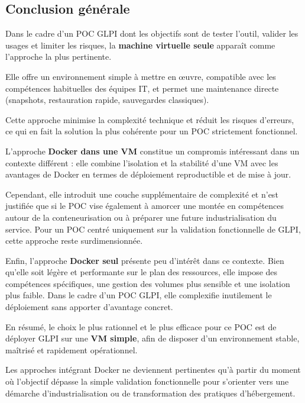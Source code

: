 \subsection*{Conclusion générale}

\noindent Dans le cadre d’un POC GLPI dont les objectifs sont de tester l’outil, valider les usages et limiter les risques, la \textbf{machine virtuelle seule} apparaît comme l’approche la plus pertinente.

\noindent Elle offre un environnement simple à mettre en œuvre, compatible avec les compétences habituelles des équipes IT, et permet une maintenance directe (snapshots, restauration rapide, sauvegardes classiques).

\noindent Cette approche minimise la complexité technique et réduit les risques d’erreurs, ce qui en fait la solution la plus cohérente pour un POC strictement fonctionnel.

\newpage

\noindent L’approche \textbf{Docker dans une VM} constitue un compromis intéressant dans un contexte différent : elle combine l’isolation et la stabilité d’une VM avec les avantages de Docker en termes de déploiement reproductible et de mise à jour.

\noindent Cependant, elle introduit une couche supplémentaire de complexité et n’est justifiée que si le POC vise également à amorcer une montée en compétences autour de la conteneurisation ou à préparer une future industrialisation du service. Pour un POC centré uniquement sur la validation fonctionnelle de GLPI, cette approche reste surdimensionnée.

\noindent Enfin, l’approche \textbf{Docker seul} présente peu d’intérêt dans ce contexte. Bien qu’elle soit légère et performante sur le plan des ressources, elle impose des compétences spécifiques, une gestion des volumes plus sensible et une isolation plus faible. Dans le cadre d’un POC GLPI, elle complexifie inutilement le déploiement sans apporter d’avantage concret.

\noindent En résumé, le choix le plus rationnel et le plus efficace pour ce POC est de déployer GLPI sur une \textbf{VM simple}, afin de disposer d’un environnement stable, maîtrisé et rapidement opérationnel.

\noindent Les approches intégrant Docker ne deviennent pertinentes qu’à partir du moment où l’objectif dépasse la simple validation fonctionnelle pour s’orienter vers une démarche d’industrialisation ou de transformation des pratiques d’hébergement.


